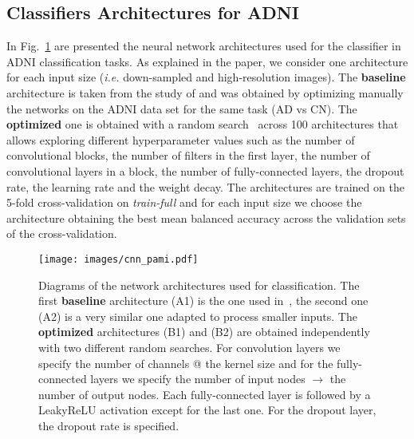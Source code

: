 \documentclass[10pt,journal,compsoc]{IEEEtran}
\begin{document}
\subsection{Classifiers Architectures for ADNI}\label{appendix D.4}
In Fig.~\ref{app architectures} are presented the neural network architectures used for the classifier in ADNI classification tasks. As explained in the paper, we consider one architecture for each input size (\emph{i.e.} down-sampled and high-resolution images). The \textbf{baseline} architecture is taken from the study of \cite{wen_convolutional_2020} and was obtained by optimizing manually the networks on the ADNI data set for the same task (AD vs CN). The \textbf{optimized} one is obtained with a random search~\cite{bergstra_random_2012} across 100 architectures that allows exploring different hyperparameter values such as the number of convolutional blocks, the number of filters in the first layer, the number of convolutional layers in a block, the number of fully-connected layers, the dropout rate, the learning rate and the weight decay.  The architectures are trained on the 5-fold cross-validation on \textit{train-full} and for each input size we choose the architecture obtaining the best mean balanced accuracy across the validation sets of the cross-validation.
 
\begin{figure}[ht]
\centering
\texttt{[image: images/cnn\_pami.pdf]}
\caption{Diagrams of the network architectures used for classification. The first \textbf{baseline} architecture (A1) is the one used in~\cite{wen_convolutional_2020}, the second one (A2) is a very similar one adapted to process smaller inputs. The \textbf{optimized} architectures (B1) and (B2) are obtained independently with two different random searches. For convolution layers we specify the number of channels @ the kernel size and for the fully-connected layers we specify the number of input nodes $\rightarrow$ the number of output nodes. Each fully-connected layer is followed by a LeakyReLU activation except for the last one. For the dropout layer, the dropout rate is specified.} 
\label{app architectures}
\end{figure}
\end{document}

